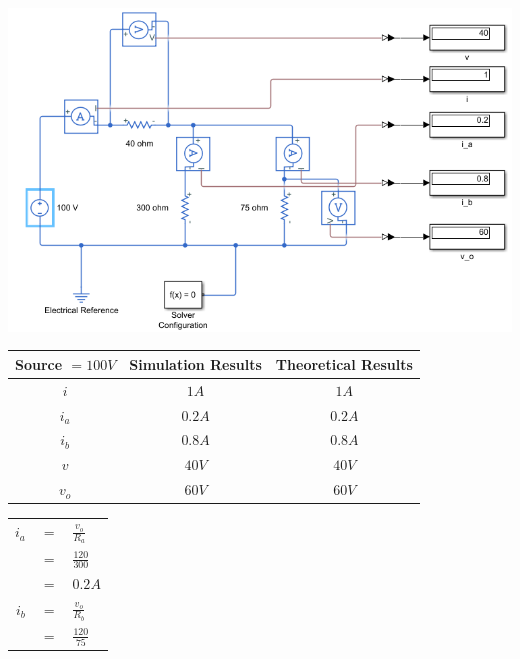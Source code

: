 \documentclass[a4paper]{article}
\begin{document}
\begin{itemize}
\begin{itemize}
	      \end{itemize}
	      \includegraphics[scale=0.5]{circuit-1+100.png}\\
	      \begin{tabular}{|c|c|c|}
	      	\hline
	      	Source $= 100 V$ & Simulation Results & Theoretical Results \\
	      	\hline
	      	$i$              & $1A$               & $1A$                \\
	      	\hline
	      	$i_{a}$          & $0.2A$             & $0.2A$              \\
	      	\hline
	      	$i_{b}$          & $0.8A$             & $0.8A$              \\
	      	\hline
	      	$v$              & $40V$              & $40V$               \\
	      	\hline
	      	$v_{o}$          & $60V$              & $60V$               \\
	      	\hline
	      \end{tabular} 
	      \begin{tabular}{rcl}
	      	$i_{a}$ & $=$ & $\frac{v_{o}}{R_{a}}$                                                    \\
	      	        & $=$ & $\frac{120}{300}$                                                        \\
	      	        & $=$ & $0.2A$                                                                   \\
	      	$i_{b}$ & $=$ & $\frac{v_{o}}{R_{b}}$                                                    \\
	      	        & $=$ & $\frac{120}{75}$                                                         \\

\end{tabular}
\end{itemize}
\end{document}

